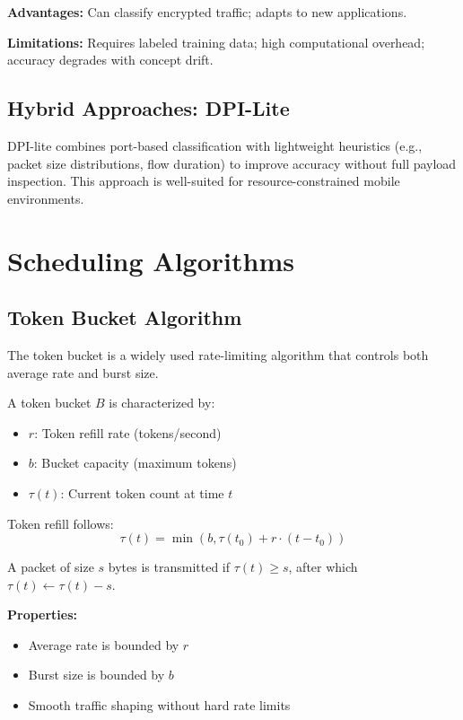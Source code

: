 \textbf{Advantages:} Can classify encrypted traffic; adapts to new applications.

\textbf{Limitations:} Requires labeled training data; high computational overhead; accuracy degrades with concept drift.

\subsection{Hybrid Approaches: DPI-Lite}

DPI-lite combines port-based classification with lightweight heuristics (e.g., packet size distributions, flow duration) to improve accuracy without full payload inspection. This approach is well-suited for resource-constrained mobile environments.

\section{Scheduling Algorithms}
\label{sec:scheduling-algorithms}

\subsection{Token Bucket Algorithm}

The token bucket is a widely used rate-limiting algorithm that controls both average rate and burst size.

\begin{definition}
A token bucket $B$ is characterized by:
\begin{itemize}
    \item $r$: Token refill rate (tokens/second)
    \item $b$: Bucket capacity (maximum tokens)
    \item $\tau(t)$: Current token count at time $t$
\end{itemize}

Token refill follows:
\begin{equation}
\tau(t) = \min\left(b, \tau(t_0) + r \cdot (t - t_0)\right)
\end{equation}

A packet of size $s$ bytes is transmitted if $\tau(t) \geq s$, after which $\tau(t) \gets \tau(t) - s$.
\end{definition}

\textbf{Properties:}
\begin{itemize}
    \item Average rate is bounded by $r$
    \item Burst size is bounded by $b$
    \item Smooth traffic shaping without hard rate limits
\end{itemize}

